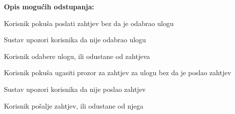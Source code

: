 \begin{packed_item}
						\item  \textbf{Opis mogućih odstupanja:}
						
						\item[] \begin{packed_item}
						
							\item[3.a] Korisnik pokuša poslati zahtjev bez da je odabrao ulogu
							\item[] \begin{packed_enum}
								
								\item Sustav upozori korisnika da nije odabrao ulogu
								\item Korisnik odabere ulogu, ili odustane od zahtjeva
								
							\end{packed_enum}
	
							\item[3.a] Korisnik pokuša ugasiti prozor za zahtjev za ulogu bez da je poslao zahtjev
							\item[] \begin{packed_enum}
								
								\item Sustav upozori korisnika da nije poslao zahtjev
								\item Korisnik pošalje zahtjev, ili odustane od njega
								
							\end{packed_enum}
							
						\end{packed_item}
					\end{packed_item}
					
